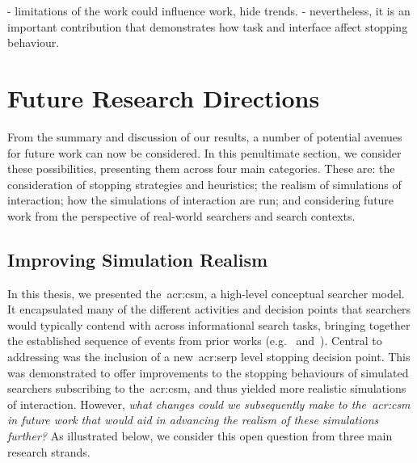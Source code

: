- limitations of the work could influence work, hide trends.
- nevertheless, it is an important contribution that demonstrates how task and interface affect stopping behaviour.

\section{Future Research Directions}\label{sec:conclusions:future}
From the summary and discussion of our results, a number of potential avenues for future work can now be considered. In this penultimate section, we consider these possibilities, presenting them across four main categories. These are: the consideration of stopping strategies and heuristics; the realism of simulations of interaction; how the simulations of interaction are run; and considering future work from the perspective of real-world searchers and search contexts.

\subsection{Improving Simulation Realism}\label{sec:conclusions:future:improving}
In this thesis, we presented the~\gls{acr:csm}, a high-level conceptual searcher model. It encapsulated many of the different activities and decision points that searchers would typically contend with across informational search tasks, bringing together the established sequence of events from prior works (e.g.~\cite{baskaya2013behavioural_factors} and~\cite{thomas2014modelling_behaviour}). Central to addressing  was the inclusion of a new~\gls{acr:serp} level stopping decision point. This was demonstrated to offer improvements to the stopping behaviours of simulated searchers subscribing to the~\gls{acr:csm}, and thus yielded more realistic simulations of interaction. However, \emph{what changes could we subsequently make to the~\gls{acr:csm} in future work that would aid in advancing the realism of these simulations further?} As illustrated below, we consider this open question from three main research strands.

\begin{figure}[h!]
    \centering
\end{figure}

